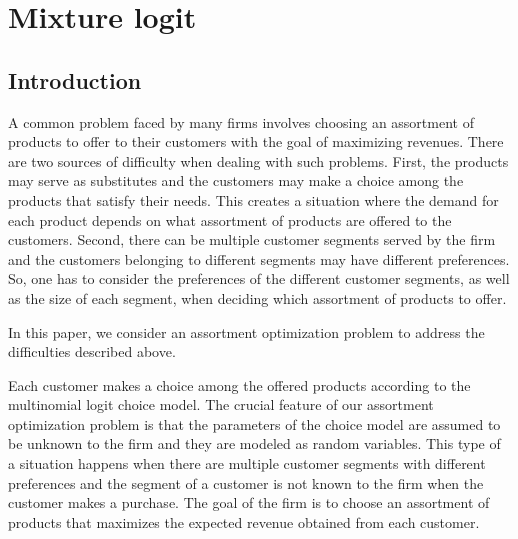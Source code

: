 \newcommand{\bV}{{\bm V}}
\newcommand{\Vhat}{\hat{V}}  

\chapter{Mixture logit}

\section{Introduction}

A common problem faced by many firms involves choosing an assortment of products to offer to their customers with the goal of maximizing revenues. There are two sources of difficulty when dealing with such problems. First, the products may serve as substitutes and the customers may make a choice among the products that satisfy their needs. This creates a situation where the demand for each product  depends on what assortment of products are offered to the customers. Second, there can be multiple customer segments served by the firm and the customers belonging to different segments may have different preferences. So, one has to consider the preferences of the different customer segments, as well as the size of each segment, when deciding which assortment of products to offer.


In this paper, we consider an assortment optimization problem to address the difficulties described above.

Each customer makes a choice among the offered products according to the multinomial logit choice model. The crucial feature of our assortment optimization problem is that the parameters of the choice model are assumed to be unknown to the firm and they are modeled as random variables. This type of a situation happens when there are multiple customer segments with different preferences and the segment of a customer is not known to the firm when the customer makes a purchase. The goal of the firm is to choose an assortment of products that maximizes the expected revenue obtained from each customer.

